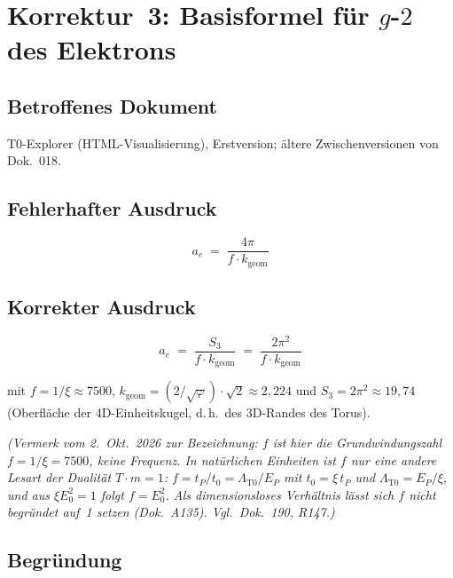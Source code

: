 \section{\texorpdfstring{Korrektur~3: Basisformel für $g$-$2$ des Elektrons}{Korrektur 3: Basisformel für g-2 des Elektrons}}

\subsection*{Betroffenes Dokument}

T0-Explorer (HTML-Visualisierung), Erstversion; ältere Zwischenversionen
von Dok.~018.

\subsection*{Fehlerhafter Ausdruck}

\begin{equation}
  a_e \;=\; \frac{4\pi}{f \cdot k_{\text{geom}}}
  \tag{alt -- falsch}
\end{equation}

\subsection*{Korrekter Ausdruck}

\begin{equation}
  \boxed{
    a_e \;=\; \frac{S_3}{f \cdot k_{\text{geom}}}
    \;=\; \frac{2\pi^2}{f \cdot k_{\text{geom}}}
  }
  \tag{190.4}
\end{equation}

mit $f = 1/\xi \approx 7500$, $k_{\text{geom}} = (2/\sqrt{\varphi})\cdot\sqrt{2} \approx 2{,}224$
und $S_3 = 2\pi^2 \approx 19{,}74$ (Oberfläche der 4D-Einheitskugel,
d.\,h.\ des 3D-Randes des Torus).

\textit{(Vermerk vom 2.~Okt.~2026 zur Bezeichnung: $f$ ist hier die Grundwindungszahl $f = 1/\xi = 7500$, keine Frequenz. In natürlichen Einheiten ist $f$ nur eine andere Lesart der Dualität $T\cdot m = 1$: $f = t_P/t_0 = \Lambda_{\text{T0}}/E_P$ mit $t_0 = \xi\,t_P$ und $\Lambda_{\text{T0}} = E_P/\xi$, und aus $\xi E_0^2 = 1$ folgt $f = E_0^2$. Als dimensionsloses Verhältnis lässt sich $f$ nicht begründet auf~1 setzen (Dok.~A135). Vgl.\ Dok.~190, R147.)}

\subsection*{Begründung}


